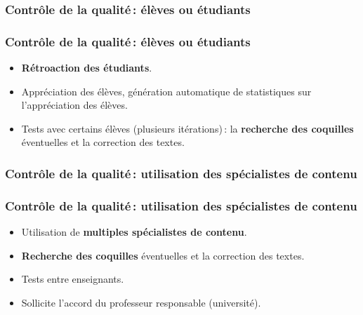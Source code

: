 					\subsubsection{Contrôle de la qualité\,: élèves ou étudiants} 
							\begin{frame}
							\frametitle{Contrôle de la qualité\,: élèves ou étudiants}
                        			
							\begin{itemize}
							
							\item \textbf{Rétroaction des étudiants}.
							\item Appréciation des élèves, génération automatique de statistiques sur l’appréciation des élèves.
							\item Tests avec certains élèves (plusieurs itérations)\,: la \textbf{recherche des coquilles }éventuelles et la correction des textes.										
							\end{itemize}						
					\end{frame}	
					
					\subsubsection{Contrôle de la qualité\,: utilisation des spécialistes de contenu} 
							\begin{frame}
							\frametitle{Contrôle de la qualité\,: utilisation des spécialistes de contenu}
                        			
							\begin{itemize}
							
							\item Utilisation de \textbf{multiples spécialistes de contenu}.
							\item \textbf{Recherche des coquilles} éventuelles et la correction des textes.
							\item Tests entre enseignants.
							\item Sollicite l’accord du professeur responsable (université).
							\end{itemize}						
					\end{frame}	
					
